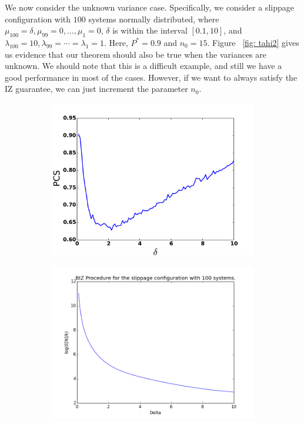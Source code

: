 \documentclass{wscpaperproc}
\theoremstyle{wsc}
\begin{document}
We now consider the unknown variance case. Specifically, we consider a slippage configuration 
with $100$ systems normally distributed, where $\mu_{100}=\delta,\mu_{99}=0,\dots,\mu_{1}=0$, $\delta$ is 
within the interval $[0.1,10]$, and $\lambda_{100}=10,\lambda_{99}=\cdots=\lambda_{1}=1$. Here, $P^*=0.9$ and $n_{0}=15$.
Figure ~\ref{fig: tahi2} gives us evidence that our theorem should also be true when the variances are unknown. We should note that
this is a difficult example, and still we have a good performance in most of the cases. However, if we want to always satisfy the IZ guarantee, 
we can just increment the parameter $n_{0}$.

\begin{figure}
    \centering
    \begin{subfigure}[b]{0.4\textwidth}
        \centering
        \includegraphics[width=\textwidth]{plot3}
    \end{subfigure}
    \hfill
    \begin{subfigure}[b]{0.4\textwidth}
        \centering
        \includegraphics[width=\textwidth]{plot4}

\end{subfigure}
\end{figure}
\end{document}
